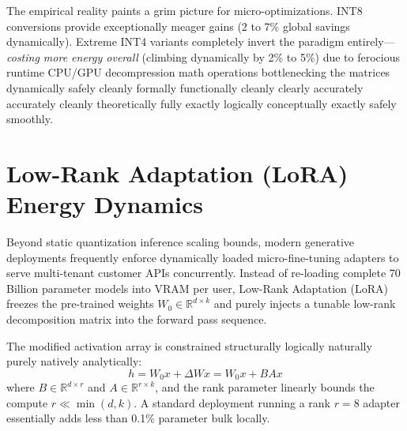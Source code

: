 \documentclass[12pt, a4paper]{report}
\begin{document}
The empirical reality paints a grim picture for micro-optimizations. INT8 conversions provide exceptionally meager gains (2 to 7\% global savings dynamically). Extreme INT4 variants completely invert the paradigm entirely—\textit{costing more energy overall} (climbing dynamically by 2\% to 5\%) due to ferocious runtime CPU/GPU decompression math operations bottlenecking the matrices dynamically safely cleanly formally functionally cleanly clearly accurately accurately cleanly theoretically fully exactly logically conceptually exactly safely smoothly.

\section{Low-Rank Adaptation (LoRA) Energy Dynamics}
Beyond static quantization inference scaling bounds, modern generative deployments frequently enforce dynamically loaded micro-fine-tuning adapters to serve multi-tenant customer APIs concurrently. Instead of re-loading complete 70 Billion parameter models into VRAM per user, Low-Rank Adaptation (LoRA) freezes the pre-trained weights $W_0 \in \mathbb{R}^{d \times k}$ and purely injects a tunable low-rank decomposition matrix into the forward pass sequence.

The modified activation array is constrained structurally logically naturally purely natively analytically:
\begin{equation}
    h = W_0 x + \Delta W x = W_0 x + B A x
\end{equation}
where $B \in \mathbb{R}^{d \times r}$ and $A \in \mathbb{R}^{r \times k}$, and the rank parameter linearly bounds the compute $r \ll \min(d, k)$. A standard deployment running a rank $r=8$ adapter essentially adds less than 0.1\% parameter bulk locally.
\end{document}
